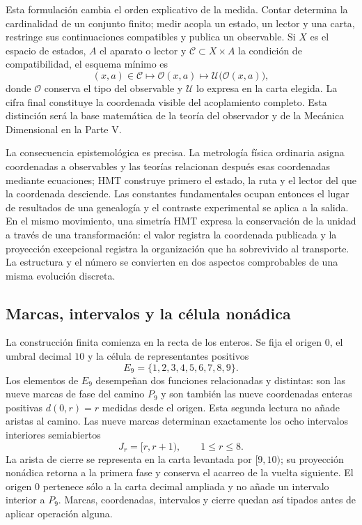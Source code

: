 Esta formulación cambia el orden explicativo de la medida. Contar determina
la cardinalidad de un conjunto finito; medir acopla un estado, un lector y
una carta, restringe sus continuaciones compatibles y publica un observable.
Si \(X\) es el espacio de estados, \(A\) el aparato o lector y
\(\mathcal C\subset X\times A\) la condición de compatibilidad, el esquema
mínimo es
\[
 (x,a)\in\mathcal C
 \longmapsto \mathcal O(x,a)
 \longmapsto \mathcal U\bigl(\mathcal O(x,a)\bigr),
\]
donde \(\mathcal O\) conserva el tipo del observable y \(\mathcal U\) lo
expresa en la carta elegida. La cifra final constituye la coordenada visible
del acoplamiento completo. Esta distinción será la base matemática de la
teoría del observador y de la Mecánica Dimensional en la Parte V.

La consecuencia epistemológica es precisa. La metrología física ordinaria
asigna coordenadas a observables y las teorías relacionan después esas
coordenadas mediante ecuaciones; HMT construye primero el estado, la ruta y el
lector del que la coordenada desciende. Las constantes fundamentales ocupan
entonces el lugar de resultados de una genealogía y el contraste experimental
se aplica a la salida. En el mismo movimiento, una simetría HMT expresa la
conservación de la unidad a través de una transformación: el valor registra la
coordenada publicada y la proyección excepcional registra la organización que
ha sobrevivido al transporte. La estructura y el número se convierten en dos
aspectos comprobables de una misma evolución discreta.

\subsection{Marcas, intervalos y la célula nonádica}

La construcción finita comienza en la recta de los enteros. Se fija el
origen \(0\), el umbral decimal \(10\) y la célula de representantes
positivos
\[
 E_9=\{1,2,3,4,5,6,7,8,9\}.
\]
Los elementos de \(E_9\) desempeñan dos funciones relacionadas y distintas:
son las nueve marcas de fase del camino \(P_9\) y son también las nueve
coordenadas enteras positivas \(d(0,r)=r\) medidas desde el origen. Esta
segunda lectura no añade aristas al camino. Las nueve marcas determinan
exactamente los ocho intervalos interiores semiabiertos
\[
 J_r=[r,r+1),\qquad 1\le r\le8.
\]
La arista de cierre se representa en la carta levantada por \([9,10)\); su
proyección nonádica retorna a la primera fase y conserva el acarreo de la
vuelta siguiente. El origen \(0\) pertenece sólo a la carta decimal ampliada
y no añade un intervalo interior a \(P_9\). Marcas, coordenadas, intervalos y
cierre quedan así tipados antes de aplicar operación alguna.

